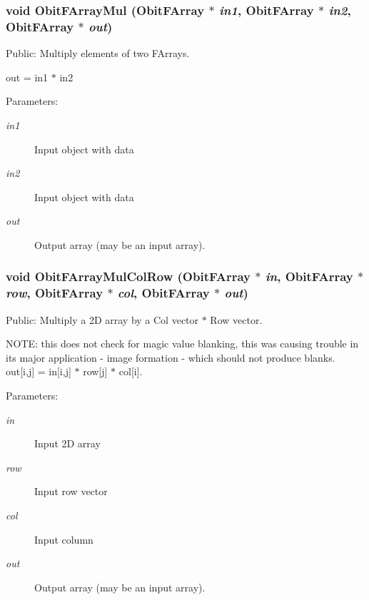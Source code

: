 \subsubsection{\setlength{\rightskip}{0pt plus 5cm}void Obit\-FArray\-Mul ({\bf Obit\-FArray} $\ast$ {\em in1}, {\bf Obit\-FArray} $\ast$ {\em in2}, {\bf Obit\-FArray} $\ast$ {\em out})}\label{ObitFArray_8h_a95}


Public: Multiply elements of two FArrays. 

out = in1 $\ast$ in2 \begin{Desc}
\item[Parameters:]
\begin{description}
\item[{\em in1}]Input object with data \item[{\em in2}]Input object with data \item[{\em out}]Output array (may be an input array). \end{description}
\end{Desc}
\subsubsection{\setlength{\rightskip}{0pt plus 5cm}void Obit\-FArray\-Mul\-Col\-Row ({\bf Obit\-FArray} $\ast$ {\em in}, {\bf Obit\-FArray} $\ast$ {\em row}, {\bf Obit\-FArray} $\ast$ {\em col}, {\bf Obit\-FArray} $\ast$ {\em out})}\label{ObitFArray_8h_a99}


Public: Multiply a 2D array by a Col vector $\ast$ Row vector. 

NOTE: this does not check for magic value blanking, this was causing trouble in its major application - image formation - which should not produce blanks. out[i,j] = in[i,j] $\ast$ row[j] $\ast$ col[i]. \begin{Desc}
\item[Parameters:]
\begin{description}
\item[{\em in}]Input 2D array \item[{\em row}]Input row vector \item[{\em col}]Input column \item[{\em out}]Output array (may be an input array). \end{description}
\end{Desc}
